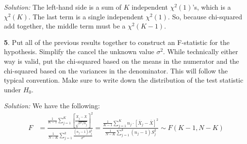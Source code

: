 \documentclass{tufte-handout}
\begin{document}
\textit{Solution:} The left-hand side is a sum of $K$ independent $\chi^2(1)$'s, which is a
$\chi^2(K)$. The last term is a single independent $\chi^2(1)$. So, because
chi-squared add together, the middle term must be a $\chi^2(K - 1)$.

\textbf{5}. Put all of the previous results together to construct an F-statistic for the
hypothesis. Simplify the cancel the unknown value $\sigma^2$. While technically
either way is valid, put the chi-squared based on the means in the numerator and
the chi-squared based on the variances in the denominator. This will follow the
typical convention. Make sure to write down the distribution of the test statistic
under $H_0$.

\textit{Solution:} We have the following:
\begin{align*}
F &= \frac{
  \frac{1}{K-1} \sum_{j=1}^K \left[\frac{\bar{X}_j - \bar{X}}{\sqrt{\sigma^2 / n_j}}\right]^2
}{
  \frac{1}{N-K} \sum_{j=1}^k \frac{(n_j - 1) S_j^2}{\sigma^2}
} = \frac{
  \frac{1}{K-1} \sum_{j=1}^K n_j \cdot \left[\bar{X}_j - \bar{X}\right]^2
}{
  \frac{1}{N-K} \sum_{j=1}^k (n_j - 1) S_j^2
} \sim F(K-1, N-K)
\end{align*}
\end{document}
